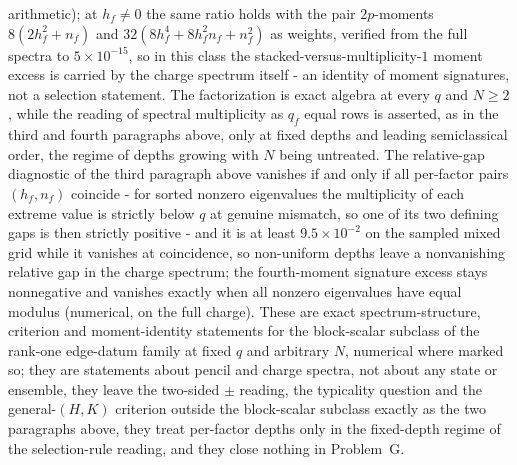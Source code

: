 arithmetic); at \(h_f\ne0\) the same ratio holds with the pair \(2p\)-moments \(8(2h_f^{2}+n_f)\) and \(32(8h_f^{4}+8h_f^{2}n_f+n_f^{2})\) as weights, verified from the full spectra to \(5\times10^{-15}\), so in this class the stacked-versus-multiplicity-\(1\) moment excess is carried by the charge spectrum itself - an identity of moment signatures, not a selection statement. The factorization is exact algebra at every \(q\) and \(N\ge2\), while the reading of spectral multiplicity as \(q_f\) equal rows is asserted, as in the third and fourth paragraphs above, only at fixed depths and leading semiclassical order, the regime of depths growing with \(N\) being untreated. The relative-gap diagnostic of the third paragraph above vanishes if and only if all per-factor pairs \((h_f,n_f)\) coincide - for sorted nonzero eigenvalues the multiplicity of each extreme value is strictly below \(q\) at genuine mismatch, so one of its two defining gaps is then strictly positive - and it is at least \(9.5\times10^{-2}\) on the sampled mixed grid while it vanishes at coincidence, so non-uniform depths leave a nonvanishing relative gap in the charge spectrum; the fourth-moment signature excess stays nonnegative and vanishes exactly when all nonzero eigenvalues have equal modulus (numerical, on the full charge). These are exact spectrum-structure, criterion and moment-identity statements for the block-scalar subclass of the rank-one edge-datum family at fixed \(q\) and arbitrary \(N\), numerical where marked so; they are statements about pencil and charge spectra, not about any state or ensemble, they leave the two-sided \(\pm\) reading, the typicality question and the general-\((H,K)\) criterion outside the block-scalar subclass exactly as the two paragraphs above, they treat per-factor depths only in the fixed-depth regime of the selection-rule reading, and they close nothing in Problem~G.
